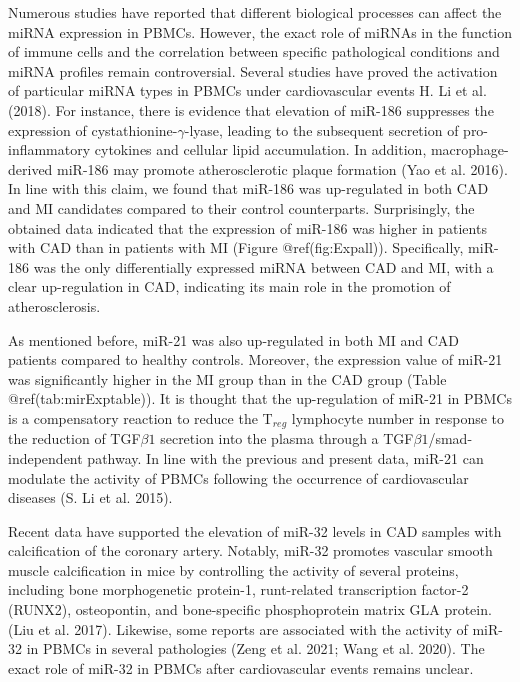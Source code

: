 \documentclass[
]{article}
\begin{document}
Numerous studies have reported that different biological processes can
affect the miRNA expression in PBMCs. However, the exact role of miRNAs
in the function of immune cells and the correlation between specific
pathological conditions and miRNA profiles remain controversial. Several
studies have proved the activation of particular miRNA types in PBMCs
under cardiovascular events H. Li et al. (2018). For instance, there is
evidence that elevation of miR-186 suppresses the expression of
cystathionine-\(\gamma\)-lyase, leading to the subsequent secretion of
pro-inflammatory cytokines and cellular lipid accumulation. In addition,
macrophage-derived miR-186 may promote atherosclerotic plaque formation
(Yao et al. 2016). In line with this claim, we found that miR-186 was
up-regulated in both CAD and MI candidates compared to their control
counterparts. Surprisingly, the obtained data indicated that the
expression of miR-186 was higher in patients with CAD than in patients
with MI (Figure @ref(fig:Expall)). Specifically, miR-186 was the only
differentially expressed miRNA between CAD and MI, with a clear
up-regulation in CAD, indicating its main role in the promotion of
atherosclerosis.

As mentioned before, miR-21 was also up-regulated in both MI and CAD
patients compared to healthy controls. Moreover, the expression value of
miR-21 was significantly higher in the MI group than in the CAD group
(Table @ref(tab:mirExptable)). It is thought that the up-regulation of
miR-21 in PBMCs is a compensatory reaction to reduce the T\(_{reg}\)
lymphocyte number in response to the reduction of TGF\(\beta1\)
secretion into the plasma through a TGF\(\beta1\)/smad-independent
pathway. In line with the previous and present data, miR-21 can modulate
the activity of PBMCs following the occurrence of cardiovascular
diseases (S. Li et al. 2015).

Recent data have supported the elevation of miR-32 levels in CAD samples
with calcification of the coronary artery. Notably, miR-32 promotes
vascular smooth muscle calcification in mice by controlling the activity
of several proteins, including bone morphogenetic protein-1,
runt-related transcription factor-2 (RUNX2), osteopontin, and
bone-specific phosphoprotein matrix GLA protein. (Liu et al. 2017).
Likewise, some reports are associated with the activity of miR-32 in
PBMCs in several pathologies (Zeng et al. 2021; Wang et al. 2020). The
exact role of miR-32 in PBMCs after cardiovascular events remains
unclear.
\end{document}

